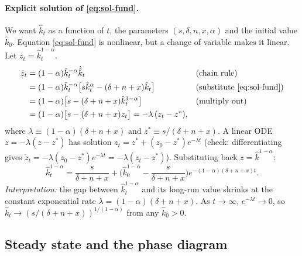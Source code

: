 \paragraph{Explicit solution of \eqref{eq:sol-fund}.} We want $\hat k_t$ as a function of $t$, the parameters $(s,\delta,n,x,\alpha)$ and the initial value $\hat k_0$. Equation \eqref{eq:sol-fund} is nonlinear, but a change of variable makes it linear. Let $z_t = \hat k_t^{1-\alpha}$.
\begin{align*}
\dot z_t &= (1-\alpha)\hat k_t^{-\alpha}\dot{\hat k}_t && \text{(chain rule)}\\
&= (1-\alpha)\hat k_t^{-\alpha}\big[s\hat k_t^{\alpha}-(\delta+n+x)\hat k_t\big] && \text{(substitute \eqref{eq:sol-fund})}\\
&= (1-\alpha)\big[s-(\delta+n+x)\hat k_t^{1-\alpha}\big] && \text{(multiply out)}\\
&= (1-\alpha)\big[s-(\delta+n+x)z_t\big] = -\lambda\,(z_t - z^{*}),
\end{align*}
where $\lambda \equiv (1-\alpha)(\delta+n+x)$ and $z^{*}\equiv s/(\delta+n+x)$. A linear ODE $\dot z = -\lambda(z-z^*)$ has solution $z_t = z^*+(z_0-z^*)e^{-\lambda t}$ (check: differentiating gives $\dot z_t = -\lambda(z_0-z^*)e^{-\lambda t} = -\lambda(z_t-z^*)$). Substituting back $z=\hat k^{1-\alpha}$:
\begin{equation}\label{eq:sol-path}
\hat k_t^{1-\alpha}=\frac{s}{\delta+n+x}+\Big(\hat k_0^{1-\alpha}-\frac{s}{\delta+n+x}\Big)e^{-(1-\alpha)(\delta+n+x)t}.
\end{equation}
\textit{Interpretation:} the gap between $\hat k_t^{1-\alpha}$ and its long-run value shrinks at the constant exponential rate $\lambda=(1-\alpha)(\delta+n+x)$. As $t\to\infty$, $e^{-\lambda t}\to 0$, so $\hat k_t\to (s/(\delta+n+x))^{1/(1-\alpha)}$ from any $\hat k_0>0$.

\subsection{Steady state and the phase diagram }

